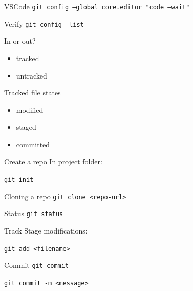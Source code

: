 \documentclass[17pt]{beamer}
\begin{document}
\begin{frame}{VSCode}
  \texttt{git config --global core.editor "code --wait"}
\end{frame}

\begin{frame}{Verify}
  \texttt{git config --list}
\end{frame}

\begin{frame}{In or out?}
  \begin{itemize}
    \item tracked
    \item untracked
  \end{itemize}
\end{frame}

\begin{frame}{Tracked file states}
  \begin{itemize}
    \item modified
    \item staged
    \item committed
  \end{itemize}
\end{frame}

\begin{frame}{Create a repo}
  In project folder:

  \texttt{git init}
\end{frame}

\begin{frame}{Cloning a repo}
  \texttt{git clone <repo-url>}
\end{frame}

\begin{frame}{Status}
  \texttt{git status}
\end{frame}

\begin{frame}{Track}
  Stage modifications:

  \texttt{git add <filename>}
\end{frame}

\begin{frame}{Commit}
  \texttt{git commit}

  \texttt{git commit -m <message>}
\end{frame}
\end{document}
